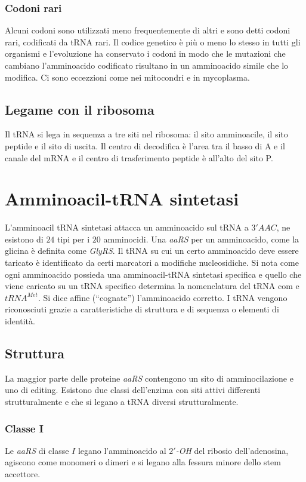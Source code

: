 \subsubsection{Codoni rari}
Alcuni codoni sono utilizzati meno frequentemente di altri e sono detti codoni rari, codificati da tRNA rari. Il codice genetico \`e pi\`u o meno lo stesso in tutti gli organismi e l'evoluzione ha 
conservato i codoni in modo che le mutazioni che cambiano l'amminoacido codificato risultano in un amminoacido simile che lo modifica. Ci sono eccezzioni come nei mitocondri e in mycoplasma. 
\subsection{Legame con il ribosoma}
Il tRNA si lega in sequenza a tre siti nel ribosoma: il sito amminoacile, il sito peptide e il sito di uscita. Il centro di decodifica \`e l'area tra il basso di A e il canale del mRNA e il
centro di trasferimento peptide \`e all'alto del sito P.
\section{Amminoacil-tRNA sintetasi}
L'amminoacil tRNA sintetasi attacca un amminoacido sul tRNA a $3'AAC$, ne esistono di $24$ tipi per i $20$ amminocidi. Una \emph{aaRS} per un amminoacido, come la glicina \`e definita come \emph{GlyRS}.
Il tRNA su cui un certo amminoacido deve essere taricato \`e identificato da certi marcatori a modifiche nucleosidiche. Si nota come ogni amminoacido possieda una amminoacil-tRNA sintetasi specifica e
quello che viene caricato su un tRNA specifico determina la nomenclatura del tRNA com e\emph{$tRNA^{Met}$}. Si dice affine (``cognate'') l'amminoacido corretto. I tRNA vengono riconosciuti grazie a 
caratteristiche di struttura e di sequenza o elementi di identit\`a.
\subsection{Struttura}
La maggior parte delle proteine \emph{aaRS} contengono un sito di amminocilazione e uno di editing. Esistono due classi dell'enzima con siti attivi differenti strutturalmente e che si legano a tRNA
diversi strutturalmente. 
\subsubsection{Classe I}
Le \emph{aaRS} di classe $I$ legano l'amminoacido al \emph{$2'$-OH} del ribosio dell'adenosina, agiscono come monomeri o dimeri e si legano alla fessura minore dello stem accettore.
